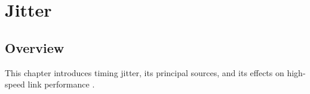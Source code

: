 \chapter{Jitter}

\section{Overview}

This chapter introduces timing jitter, its principal sources,
and its effects on high-speed link performance
\citep{palermo2025ecen720}.





